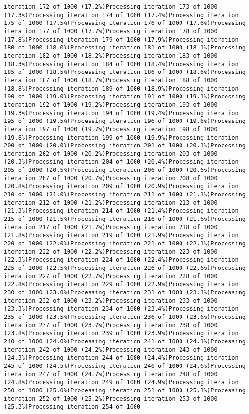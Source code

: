 \documentclass[
]{article}
\begin{document}
\begin{verbatim}
iteration 172 of 1000 (17.2%)Processing iteration 173 of 1000 (17.3%)Processing iteration 174 of 1000 (17.4%)Processing iteration 175 of 1000 (17.5%)Processing iteration 176 of 1000 (17.6%)Processing iteration 177 of 1000 (17.7%)Processing iteration 178 of 1000 (17.8%)Processing iteration 179 of 1000 (17.9%)Processing iteration 180 of 1000 (18.0%)Processing iteration 181 of 1000 (18.1%)Processing iteration 182 of 1000 (18.2%)Processing iteration 183 of 1000 (18.3%)Processing iteration 184 of 1000 (18.4%)Processing iteration 185 of 1000 (18.5%)Processing iteration 186 of 1000 (18.6%)Processing iteration 187 of 1000 (18.7%)Processing iteration 188 of 1000 (18.8%)Processing iteration 189 of 1000 (18.9%)Processing iteration 190 of 1000 (19.0%)Processing iteration 191 of 1000 (19.1%)Processing iteration 192 of 1000 (19.2%)Processing iteration 193 of 1000 (19.3%)Processing iteration 194 of 1000 (19.4%)Processing iteration 195 of 1000 (19.5%)Processing iteration 196 of 1000 (19.6%)Processing iteration 197 of 1000 (19.7%)Processing iteration 198 of 1000 (19.8%)Processing iteration 199 of 1000 (19.9%)Processing iteration 200 of 1000 (20.0%)Processing iteration 201 of 1000 (20.1%)Processing iteration 202 of 1000 (20.2%)Processing iteration 203 of 1000 (20.3%)Processing iteration 204 of 1000 (20.4%)Processing iteration 205 of 1000 (20.5%)Processing iteration 206 of 1000 (20.6%)Processing iteration 207 of 1000 (20.7%)Processing iteration 208 of 1000 (20.8%)Processing iteration 209 of 1000 (20.9%)Processing iteration 210 of 1000 (21.0%)Processing iteration 211 of 1000 (21.1%)Processing iteration 212 of 1000 (21.2%)Processing iteration 213 of 1000 (21.3%)Processing iteration 214 of 1000 (21.4%)Processing iteration 215 of 1000 (21.5%)Processing iteration 216 of 1000 (21.6%)Processing iteration 217 of 1000 (21.7%)Processing iteration 218 of 1000 (21.8%)Processing iteration 219 of 1000 (21.9%)Processing iteration 220 of 1000 (22.0%)Processing iteration 221 of 1000 (22.1%)Processing iteration 222 of 1000 (22.2%)Processing iteration 223 of 1000 (22.3%)Processing iteration 224 of 1000 (22.4%)Processing iteration 225 of 1000 (22.5%)Processing iteration 226 of 1000 (22.6%)Processing iteration 227 of 1000 (22.7%)Processing iteration 228 of 1000 (22.8%)Processing iteration 229 of 1000 (22.9%)Processing iteration 230 of 1000 (23.0%)Processing iteration 231 of 1000 (23.1%)Processing iteration 232 of 1000 (23.2%)Processing iteration 233 of 1000 (23.3%)Processing iteration 234 of 1000 (23.4%)Processing iteration 235 of 1000 (23.5%)Processing iteration 236 of 1000 (23.6%)Processing iteration 237 of 1000 (23.7%)Processing iteration 238 of 1000 (23.8%)Processing iteration 239 of 1000 (23.9%)Processing iteration 240 of 1000 (24.0%)Processing iteration 241 of 1000 (24.1%)Processing iteration 242 of 1000 (24.2%)Processing iteration 243 of 1000 (24.3%)Processing iteration 244 of 1000 (24.4%)Processing iteration 245 of 1000 (24.5%)Processing iteration 246 of 1000 (24.6%)Processing iteration 247 of 1000 (24.7%)Processing iteration 248 of 1000 (24.8%)Processing iteration 249 of 1000 (24.9%)Processing iteration 250 of 1000 (25.0%)Processing iteration 251 of 1000 (25.1%)Processing iteration 252 of 1000 (25.2%)Processing iteration 253 of 1000 (25.3%)Processing iteration 254 of 1000 
\end{verbatim}
\end{document}
